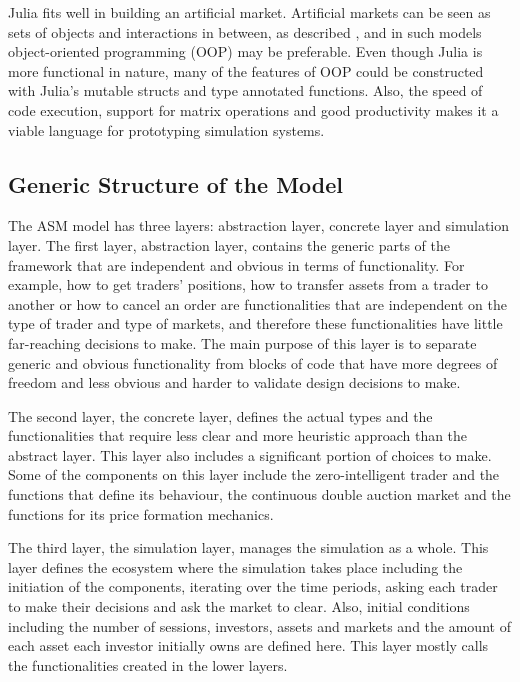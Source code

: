 Julia fits well in building an artificial market.
Artificial markets can be seen as sets of objects
and interactions in between, as described \citet{Ben12},
and in such models object-oriented programming (OOP)
may be preferable. Even though Julia is more functional in nature, 
many of the features of OOP could be constructed with Julia's mutable structs 
and type annotated functions. Also, the speed of code execution, 
support for matrix operations and good productivity makes 
it a viable language for prototyping simulation systems. 


\subsection{Generic Structure of the Model}
The ASM model has three layers: abstraction layer, concrete 
layer and simulation layer. The first layer, abstraction layer, contains the 
generic parts of the framework that are independent and obvious in terms
of functionality. For example, how to get traders' positions, how to
transfer assets from a trader to another or how to cancel an order are
functionalities that are independent on the type of trader 
and type of markets, and therefore these functionalities have little
far-reaching decisions to make. The main purpose of this layer
is to separate generic and obvious functionality from blocks of code
that have more degrees of freedom and less obvious and harder to validate 
design decisions to make.

The second layer, the concrete layer, defines the actual types and the
functionalities that require less clear and more heuristic
approach than the abstract layer. This layer also includes a significant
portion of choices to make. Some of the components
on this layer include the zero-intelligent trader and the
functions that define its behaviour, the continuous double auction
market and the functions for its price formation mechanics.

The third layer, the simulation layer, manages the simulation as a whole.
This layer defines the ecosystem where the simulation takes place including
the initiation of the components, iterating over the time periods, asking
each trader to make their decisions and ask the market to clear. 
Also, initial conditions including the number of sessions, investors, assets and markets
and the amount of each asset each investor initially owns are defined here. 
This layer mostly calls the functionalities created in the lower layers.

